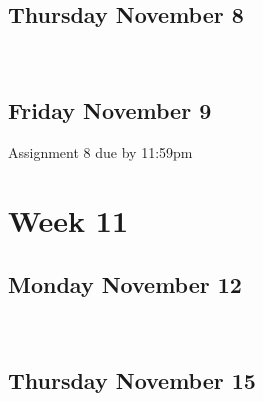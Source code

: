 \documentclass[]{book}
\let\originaltabular\tabular
\let\endoriginaltabular\endtabular
\renewenvironment{tabular}[1]{%
  \begingroup%
  \centering%
  \originaltabular{#1}}%
  {\endoriginaltabular\endgroup}
\theoremstyle{definition}
\theoremstyle{definition}
\theoremstyle{definition}
\theoremstyle{remark}
\begin{document}
\begin{table}[H]
\centering
\begin{tabular}{l}
\hline
\\
\hline
\end{tabular}
\end{table}

\subsection{Thursday November 8}\label{thursday-november-8}

\begin{table}[H]
\centering
\begin{tabular}{l}
\hline
\\
\hline
\end{tabular}
\end{table}

\subsection{Friday November 9}\label{friday-november-9}

\begin{table}[H]
\centering
\begin{tabular}{l}
\hline
Assignment 8 due by 11:59pm\\
\hline
\end{tabular}
\end{table}

\section{Week 11}\label{week-11}

\subsection{Monday November 12}\label{monday-november-12}

\begin{table}[H]
\centering
\begin{tabular}{l}
\hline
\\
\hline
\end{tabular}
\end{table}

\subsection{Thursday November 15}\label{thursday-november-15}
\end{document}
